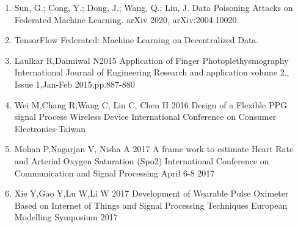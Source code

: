 \documentclass[14pt]{extarticle}
\begin{document}
\begin{enumerate}
    \item \par Sun, G.; Cong, Y.; Dong, J.; Wang, Q.; Liu, J. Data Poisoning Attacks on Federated Machine Learning. arXiv 2020, arXiv:2004.10020.
    \item \par TensorFlow Federated: Machine Learning on Decentralized Data.
    \item \par Laulkar R,Daimiwal N2015 Application of Finger Photoplethysmography International Journal of Engineering Research and application volume 2., Issue 1,Jan-Feb 2015,pp.887-880
    \item \par Wei M,Chang R,Wang C, Lin C, Chen H 2016 Design of a Flexible PPG signal Process Wireless Device International Conference on Consumer Electronics-Taiwan
    \item \par Mohan P,Nagarjan V, Nisha A 2017 A frame work to estimate Heart Rate and Arterial Oxygen Saturation (Spo2) International Conference on Communication and Signal Processing April 6-8 2017 
    \item \par Xie Y,Gao Y,Lu W,Li W 2017 Development of Wearable Pulse Oximeter Based on Internet of Things and Signal Processing Techniques European Modelling Symposium 2017
\end{enumerate}
\end{document}

